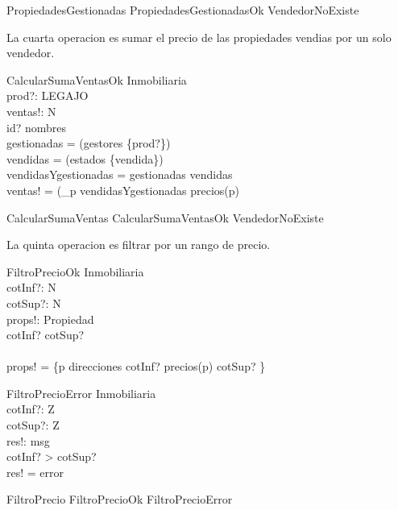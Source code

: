 \documentclass[12pt]{article}
\begin{document}
\begin{zed}
PropiedadesGestionadas  PropiedadesGestionadasOk \lor VendedorNoExiste
\end{zed}

La cuarta operacion es sumar el precio de las propiedades vendias por un solo vendedor.

\begin{schema}{CalcularSumaVentasOk}
\Xi Inmobiliaria \\
prod?: LEGAJO \\
ventas!: N \\
\where
id? \in \dom nombres \\
gestionadas = \dom(gestores \rres \{prod?\}) \\
vendidas = \dom(estados \rres \{vendida\}) \\
vendidasYgestionadas = gestionadas \cap vendidas \\
ventas! = (\sum_{p \in vendidasYgestionadas} precios(p)
\end{schema}

\begin{zed}
CalcularSumaVentas  CalcularSumaVentasOk \lor VendedorNoExiste
\end{zed}

La quinta operacion es filtrar por un rango de precio.

\begin{schema}{FiltroPrecioOk}
\Xi Inmobiliaria \\
cotInf?: N \\
cotSup?: N \\
props!: \power Propiedad \\
\where
cotInf? \leq cotSup? \\
\ \\
props! = \{p \in \dom direcciones \bullet cotInf?  \leq precios(p) \leq cotSup? \} \\

\end{schema}

\begin{schema}{FiltroPrecioError}
\Xi Inmobiliaria \\
cotInf?: Z \\
cotSup?: Z \\
res!: msg \\
\where
cotInf? > cotSup? \\
res! = error
\end{schema}

\begin{zed}
FiltroPrecio  FiltroPrecioOk \lor FiltroPrecioError
\end{zed}
\end{document}
